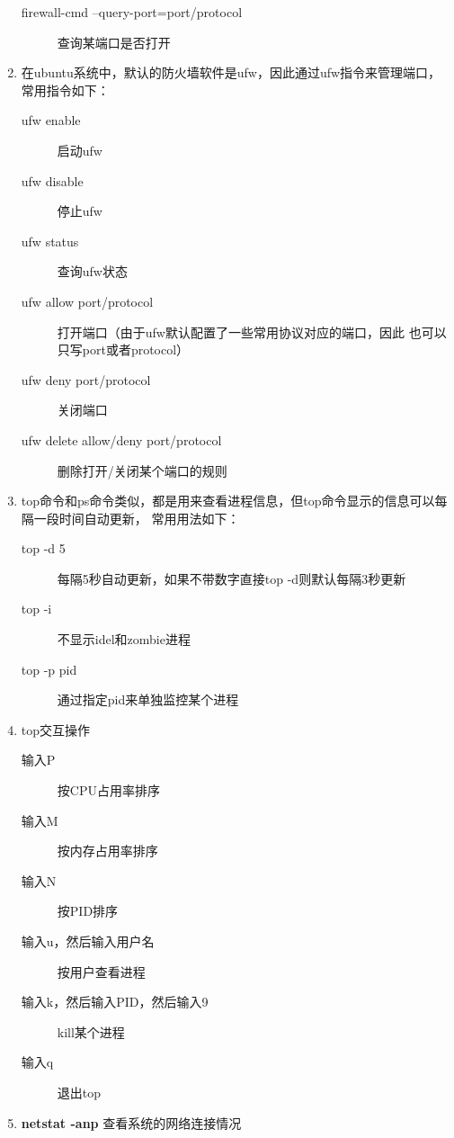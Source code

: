 \documentclass[11pt]{article}
\begin{document}
\begin{enumerate}
\begin{description}
    \item[firewall-cmd --query-port=port/protocol] 查询某端口是否打开
\end{description}
\item 在ubuntu系统中，默认的防火墙软件是ufw，因此通过ufw指令来管理端口，常用指令如下：
\begin{description}
    \item[ufw enable] 启动ufw
    \item[ufw disable] 停止ufw
    \item[ufw status] 查询ufw状态
    \item[ufw allow port/protocol] 打开端口（由于ufw默认配置了一些常用协议对应的端口，因此
    也可以只写port或者protocol）
    \item [ufw deny port/protocol] 关闭端口
    \item [ufw delete allow/deny port/protocol] 删除打开/关闭某个端口的规则
\end{description}
\item top命令和ps命令类似，都是用来查看进程信息，但top命令显示的信息可以每隔一段时间自动更新，
常用用法如下：
\begin{description}
    \item[top -d 5] 每隔5秒自动更新，如果不带数字直接top -d则默认每隔3秒更新
    \item[top -i] 不显示idel和zombie进程
    \item[top -p pid] 通过指定pid来单独监控某个进程
\end{description}
\item top交互操作
\begin{description}
    \item[输入P] 按CPU占用率排序
    \item[输入M] 按内存占用率排序
    \item[输入N] 按PID排序
    \item[输入u，然后输入用户名] 按用户查看进程
    \item[输入k，然后输入PID，然后输入9] kill某个进程
    \item[输入q] 退出top
\end{description}
\item \textbf{netstat -anp} 查看系统的网络连接情况
\end{enumerate}
\end{document}

